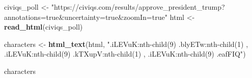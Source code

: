 \documentclass[
]{article}
\newenvironment{Shaded}{\begin{snugshade}}{\end{snugshade}}
\newcommand{\KeywordTok}[1]{\textcolor[rgb]{0.13,0.29,0.53}{\textbf{#1}}}
\newcommand{\NormalTok}[1]{#1}
\newcommand{\StringTok}[1]{\textcolor[rgb]{0.31,0.60,0.02}{#1}}
\begin{document}
\begin{Shaded}
\begin{Highlighting}[]
\NormalTok{civiqs_poll <-}\StringTok{ "https://civiqs.com/results/approve_president_trump?annotations=true&uncertainty=true&zoomIn=true"}
\NormalTok{html <-}\StringTok{ }\KeywordTok{read_html}\NormalTok{(civiqs_poll)}

\NormalTok{characters <-}\StringTok{ }\KeywordTok{html_text}\NormalTok{(html, }\StringTok{".iLEVuK:nth-child(9) .blyETw:nth-child(1) , .iLEVuK:nth-child(9) .kTXupV:nth-child(1) , .iLEVuK:nth-child(9) .eafFIQ"}\NormalTok{)}

\NormalTok{characters}
\end{Highlighting}
\end{Shaded}

\begin{verbatim}

\end{verbatim}
\end{document}
